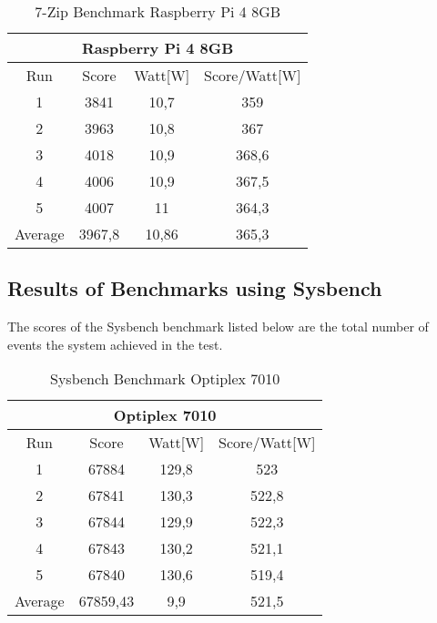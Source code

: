 \begin{table} [h!]
\centering
\caption{7-Zip Benchmark Raspberry Pi 4 8GB}
\label{tab:7zipBenchmarkRaspberryPi}
\begin{tabular}{c c c c}
\hline
 \multicolumn{4}{|c|}{Raspberry Pi 4 8GB} \\            \hline
Run & Score & Watt[W] & Score/Watt[W]\\                    \hline
1 & 3841 & 10,7 &  359\\    
2 & 3963 & 10,8 &  367\\       
3 & 4018 & 10,9 &  368,6\\       
4 & 4006 & 10,9 &  367,5\\    
5 & 4007 & 11 &  364,3\\                                \hline
Average & 3967,8 & 10,86 & 365,3\\                      \hline
\end{tabular}
\end{table}









\subsection{Results of Benchmarks using Sysbench}
The scores of the Sysbench benchmark listed below are the total number of events the system achieved in the test. 

\begin{table}[h]
\centering
\caption{Sysbench Benchmark Optiplex 7010}
\label{tab:sysbenchBenchmarkOptiplex}
\begin{tabular}{c c c c}
\hline
 \multicolumn{4}{|c|}{Optiplex 7010} \\   \hline
Run & Score & Watt[W] & Score/Watt[W]\\                    \hline
1 & 67884 & 129,8 &  523\\    
2 & 67841 & 130,3 &  522,8\\       
3 & 67844 & 129,9 &  522,3\\       
4 & 67843 & 130,2 &  521,1\\    
5 & 67840 & 130,6 &  519,4\\                             \hline
Average & 67859,43 & 9,9 & 521,5\\                       \hline
\end{tabular}
\end{table}




